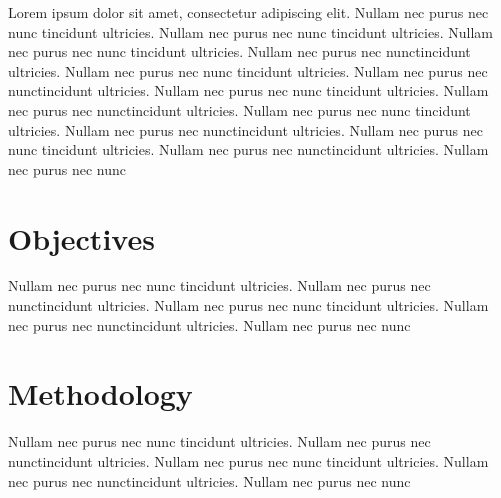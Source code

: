Lorem ipsum dolor sit amet, consectetur adipiscing elit. Nullam nec purus nec nunc tincidunt ultricies. Nullam nec purus nec nunc tincidunt ultricies. Nullam nec purus nec nunc tincidunt ultricies. Nullam nec purus nec nunctincidunt ultricies. Nullam nec purus nec nunc tincidunt ultricies. Nullam nec purus nec nunctincidunt ultricies. Nullam nec purus nec nunc tincidunt ultricies. Nullam nec purus nec nunctincidunt ultricies. Nullam nec purus nec nunc tincidunt ultricies. Nullam nec purus nec nunctincidunt ultricies. Nullam nec purus nec nunc tincidunt ultricies. Nullam nec purus nec nunctincidunt ultricies. Nullam nec purus nec nunc
\section{Objectives}
Nullam nec purus nec nunc tincidunt ultricies. Nullam nec purus nec nunctincidunt ultricies. Nullam nec purus nec nunc tincidunt ultricies. Nullam nec purus nec nunctincidunt ultricies. Nullam nec purus nec nunc
\section{Methodology}
Nullam nec purus nec nunc tincidunt ultricies. Nullam nec purus nec nunctincidunt ultricies. Nullam nec purus nec nunc tincidunt ultricies. Nullam nec purus nec nunctincidunt ultricies. Nullam nec purus nec nunc